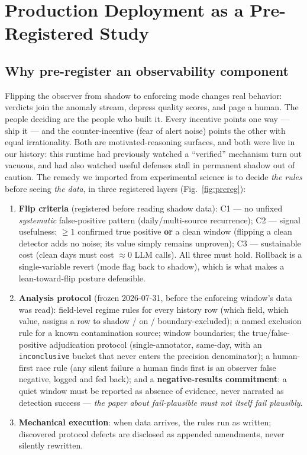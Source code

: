 \documentclass[11pt]{article}
\begin{document}
\section{Production Deployment as a Pre-Registered Study}
\label{sec:deployment}

\subsection{Why pre-register an observability component}
\label{sec:whyprereg}

Flipping the observer from shadow to enforcing mode changes real
behavior: verdicts join the anomaly stream, depress quality scores, and
page a human. The people deciding are the people who built it. Every
incentive points one way --- ship it --- and the counter-incentive
(fear of alert noise) points the other with equal irrationality. Both
are motivated-reasoning surfaces, and both were live in our history:
this runtime had previously watched a ``verified'' mechanism turn out
vacuous, and had also watched useful defenses stall in permanent shadow
out of caution. The remedy we imported from experimental science
\cite{nosek2018prereg} is to decide \emph{the rules} before seeing
\emph{the data}, in three registered layers
(Fig.~\ref{fig:prereg}):

\begin{enumerate}
\item \textbf{Flip criteria} (registered before reading shadow data):
  C1 --- no unfixed \emph{systematic} false-positive pattern
  (daily/multi-source recurrence); C2 --- signal usefulness: $\geq 1$
  confirmed true positive \textbf{or} a clean window (flipping a clean
  detector adds no noise; its value simply remains unproven); C3 ---
  sustainable cost (clean days must cost ${\approx}0$ LLM calls). All
  three must hold. Rollback is a single-variable revert (mode flag back
  to shadow), which is what makes a lean-toward-flip posture
  defensible.
\item \textbf{Analysis protocol} (frozen 2026-07-31, before the
  enforcing window's data was read): field-level regime rules for every
  history row (which field, which value, assigns a row to shadow / on /
  boundary-excluded); a named exclusion rule for a known contamination
  source; window boundaries; the true/false-positive adjudication
  protocol (single-annotator, same-day, with an \texttt{inconclusive}
  bucket that never enters the precision denominator); a human-first
  race rule (any silent failure a human finds first is an observer
  false negative, logged and fed back); and a \textbf{negative-results
  commitment}: a quiet window must be reported as absence of evidence,
  never narrated as detection success --- \emph{the paper about
  fail-plausible must not itself fail plausibly}.
\item \textbf{Mechanical execution}: when data arrives, the rules run
  as written; discovered protocol defects are disclosed as appended
  amendments, never silently rewritten.
\end{enumerate}
\end{document}
